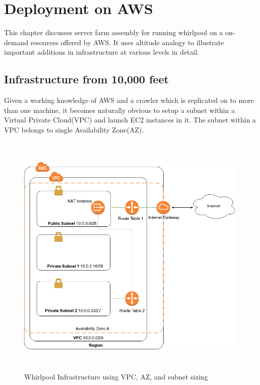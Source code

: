 \chapter{Deployment on AWS}
This chapter discusses server farm assembly for running whirlpool on a on-demand resources offered by
AWS. It uses altitude analogy to illustrate important additions in infrastructure at various levels in
detail.

\section{Infrastructure from 10,000 feet}\label{infra10k}
Given a working knowledge of AWS and a crawler which is replicated on to more than one machine, it 
becomes naturally obvious to setup a subnet within a Virtual Private Cloud(VPC) and launch EC2 instances
in it. The subnet within a VPC belongs to single Availability Zone(AZ). 
\begin{figure}[h!]
  \centering
  \includegraphics[width=18cm,height=12cm,keepaspectratio]{../media/crawler/ten-thousand-feet-aws.png}
  \caption{Whirlpool Infrastructure using VPC, AZ, and subnet sizing}
  \label{fig:infra10k}
\end{figure}

